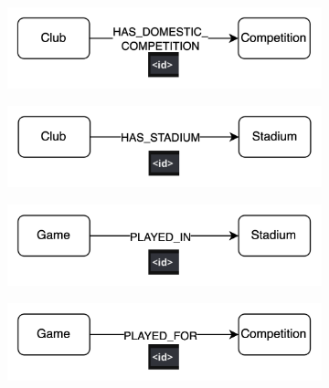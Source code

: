 \documentclass{Configuration_Files/PoliMi3i_thesis}
\begin{document}
\begin{figure}[H]
  \vspace{1em}


    \begin{subfigure}[b]{0.45\linewidth}
    \includegraphics[width=\linewidth]{Project Template/Images/relationships/hasdomesticcompetition.png}
  \end{subfigure}
  \hfill
  \begin{subfigure}[b]{0.45\linewidth}
    \includegraphics[width=\linewidth]{Project Template/Images/relationships/hasstadium.png}
  \end{subfigure}
  
  \vspace{1em}



    \begin{subfigure}[b]{0.45\linewidth}
    \includegraphics[width=\linewidth]{Project Template/Images/relationships/playedin.png}
  \end{subfigure}
  \hfill
  \begin{subfigure}[b]{0.45\linewidth}
    \includegraphics[width=\linewidth]{Project Template/Images/relationships/playsfor.png}
  \end{subfigure}
  

\end{figure}
\end{document}
